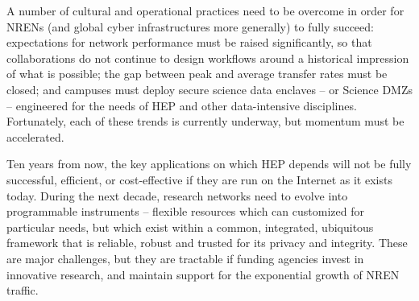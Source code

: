 A number of cultural and operational practices need to be overcome in order for NRENs (and global cyber infrastructures more generally) to fully succeed: expectations for network performance must be raised significantly, so that collaborations do not continue to design workflows around a historical impression of what is possible; the gap between peak and average transfer rates must be closed; and campuses must deploy secure science data enclaves – or  Science DMZs\cite{DMZ} – engineered for the needs of HEP and other data-intensive disciplines.  Fortunately, each of these trends is currently underway, but momentum must be accelerated.   

Ten years from now, the key applications on which HEP depends will not be fully successful, efficient, or cost-effective if they are run on the Internet as it exists today. During the next decade, research networks need to evolve into programmable instruments – flexible resources which can customized for particular needs, but which exist within a common, integrated, ubiquitous framework that is reliable, robust and trusted for its privacy and integrity. These are major challenges, but they are tractable if funding agencies invest in innovative research, and maintain support for the exponential growth of NREN traffic. 


